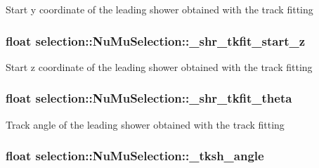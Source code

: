 Start y coordinate of the leading shower obtained with the track fitting \hypertarget{classselection_1_1NuMuSelection_a82f756e0a512e9b2ab45a0d2061d2ec3}{
\subsubsection[{\-\_\-shr\-\_\-tkfit\-\_\-start\-\_\-z}]{\setlength{\rightskip}{0pt plus 5cm}float selection\-::\-Nu\-Mu\-Selection\-::\-\_\-shr\-\_\-tkfit\-\_\-start\-\_\-z\hspace{0.3cm}{\ttfamily [private]}}}\label{classselection_1_1NuMuSelection_a82f756e0a512e9b2ab45a0d2061d2ec3}
Start z coordinate of the leading shower obtained with the track fitting \hypertarget{classselection_1_1NuMuSelection_a8a3b5a7f7bc6fa4a59fbc36bfbf5a835}{
\subsubsection[{\-\_\-shr\-\_\-tkfit\-\_\-theta}]{\setlength{\rightskip}{0pt plus 5cm}float selection\-::\-Nu\-Mu\-Selection\-::\-\_\-shr\-\_\-tkfit\-\_\-theta\hspace{0.3cm}{\ttfamily [private]}}}\label{classselection_1_1NuMuSelection_a8a3b5a7f7bc6fa4a59fbc36bfbf5a835}
Track angle of the leading shower obtained with the track fitting \hypertarget{classselection_1_1NuMuSelection_a129f335453ed7ff4678f2e388ce17575}{
\subsubsection[{\-\_\-tksh\-\_\-angle}]{\setlength{\rightskip}{0pt plus 5cm}float selection\-::\-Nu\-Mu\-Selection\-::\-\_\-tksh\-\_\-angle\hspace{0.3cm}{\ttfamily [private]}}}\label{classselection_1_1NuMuSelection_a129f335453ed7ff4678f2e388ce17575}
